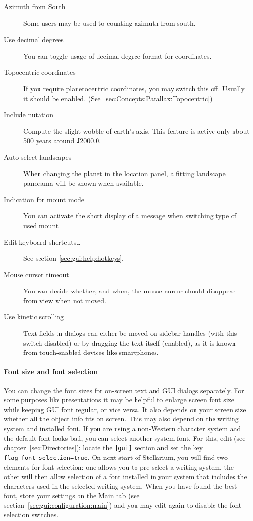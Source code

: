 \begin{description}
\item[Azimuth from South] Some users may be used to counting azimuth
  from south.
\item[Use decimal degrees] You can toggle usage of decimal degree format for coordinates.
\item[Topocentric coordinates] If you require planetocentric coordinates, you may switch this off. 
  Usually it should be enabled. (See~\ref{sec:Concepts:Parallax:Topocentric})
\item[Include nutation] Compute the slight wobble of earth's
  axis. This feature is active only about 500 years around J2000.0.
\item[Auto select landscapes] When changing the planet in the location
  panel, a fitting landscape panorama will be shown when available.
\item[Indication for mount mode] You can activate the short display of a message when switching type of used mount.
\item[Edit keyboard shortcuts\ldots] See section~\ref{sec:gui:help:hotkeys}.
\item[Mouse cursor timeout] You can decide whether, and when, the
  mouse cursor should disappear from view when not moved.
\item[Use kinetic scrolling]  Text fields in  
  dialogs can either be moved on sidebar handles (with this switch
  disabled) or by dragging the text itself (enabled), as it is known
  from touch-enabled devices like smartphones. 
\end{description}

\paragraph{Font size and font selection}  You can change the font sizes for on-screen
text and GUI dialogs separately.  For some purposes like presentations
it may be helpful to enlarge screen font size while keeping GUI font
regular, or vice versa.  It also depends on your screen size whether
all the object info fits on screen. This may also depend on the
writing system and installed font. If you are using a non-Western
character system and the default font looks bad, you can select
another system font. For this, edit  (see
chapter~\ref{sec:Directories}): locate the \texttt{[gui]} section and
set the key \texttt{flag\_font\_selection=true}. On next start of
Stellarium, you will find two elements for font selection: one allows
you to pre-select a writing system, the other will then allow
selection of a font installed in your system that includes the
characters used in the selected writing system. When you have found
the best font, store your settings on the Main tab (see
section~\ref{sec:gui:configuration:main}) and you may edit
 again to disable the font selection switches.

